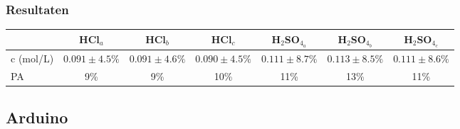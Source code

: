 \documentclass[10pt,twoside]{report}
\begin{document}
\subsubsection{Resultaten}
\begin{tabular}{|l|c|c|c||c|c|c|}
    \hline
      & HCl$_a$ & HCl$_b$ & HCl$_c$ & H$_2$SO$_{4_a}$ & H$_2$SO$_{4_b}$ & H$_2$SO$_{4_c}$ \\\hline
    c (mol/L) & $0.091\pm4.5\%$ & $0.091\pm4.6\%$ & $0.090\pm4.5\%$ & $0.111\pm8.7\%$ & $0.113\pm8.5\%$ & $0.111\pm8.6\%$ \\\hline
    PA        & 9\% & 9\% & 10\% & 11\% & 13\% & 11\% \\\hline
\end{tabular}

\newpage

\subsection{Arduino}
\end{document}
